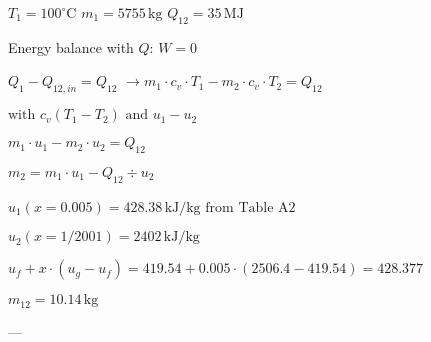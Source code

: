 \( T_1 = 100^\circ \text{C} \)  
\( m_1 = 5755 \, \text{kg} \)  
\( Q_{12} = 35 \, \text{MJ} \)  

Energy balance with \( Q \):  
\( W = 0 \)  

\( Q_1 - Q_{12,in} = Q_{12} \)  
\( \rightarrow m_1 \cdot c_v \cdot T_1 - m_2 \cdot c_v \cdot T_2 = Q_{12} \)  

\( \text{with } c_v (T_1 - T_2) \text{ and } u_1 - u_2 \)  

\( m_1 \cdot u_1 - m_2 \cdot u_2 = Q_{12} \)  

\( m_2 = m_1 \cdot u_1 - Q_{12} \div u_2 \)  

\( u_1 (x = 0.005) = 428.38 \, \text{kJ/kg} \)  
\( \text{from Table A2} \)  

\( u_2 (x = 1 / 2001) = 2402 \, \text{kJ/kg} \)  

\( u_f + x \cdot (u_g - u_f) = 419.54 + 0.005 \cdot (2506.4 - 419.54) = 428.377 \)  

\( m_{12} = 10.14 \, \text{kg} \)  

---